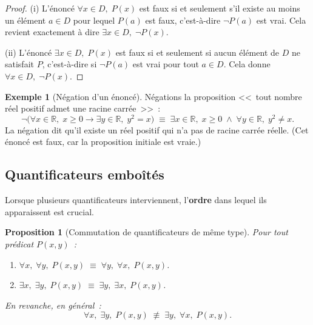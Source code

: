 \documentclass[12pt,a4paper,openany]{book}
\theoremstyle{definition}
\newtheorem{exemple}[definition]{Exemple}
\theoremstyle{plain}
\newtheorem{proposition}[definition]{Proposition}
\theoremstyle{remark}
\newcommand{\R}{\mathbb{R}}
\begin{document}
\begin{proof}
  (i) L'\'enonc\'e $\forall x \in D,\; P(x)$ est faux si et seulement s'il existe au moins un \'el\'ement $a \in D$ pour lequel $P(a)$ est faux, c'est-\`a-dire $\neg P(a)$ est vrai. Cela revient exactement \`a dire $\exists x \in D,\; \neg P(x)$.

  \smallskip
  (ii) L'\'enonc\'e $\exists x \in D,\; P(x)$ est faux si et seulement si aucun \'el\'ement de $D$ ne satisfait $P$, c'est-\`a-dire si $\neg P(a)$ est vrai pour tout $a \in D$. Cela donne $\forall x \in D,\; \neg P(x)$.
\end{proof}

\begin{exemple}[N\'egation d'un \'enonc\'e]\label{ex:negation-quantif}
  N\'egations la proposition <<~tout nombre r\'eel positif admet une racine carr\'ee~>>~:
  \[
    \neg\bigl(\forall x \in \R,\; x \geq 0 \to \exists y \in \R,\; y^2 = x\bigr)
    \;\equiv\; \exists x \in \R,\; x \geq 0 \;\land\; \forall y \in \R,\; y^2 \neq x.
  \]
  La n\'egation dit qu'il existe un r\'eel positif qui n'a pas de racine carr\'ee r\'eelle. (Cet \'enonc\'e est faux, car la proposition initiale est vraie.)
\end{exemple}

\subsection{Quantificateurs embo\^it\'es}
\label{subsec:quantificateurs-emboites}

Lorsque plusieurs quantificateurs interviennent, l'\textbf{ordre} dans lequel ils apparaissent est crucial.

\begin{proposition}[Commutation de quantificateurs de m\^eme type]\label{prop:commut-quantif}
  Pour tout pr\'edicat $P(x,y)$~:
  \begin{enumerate}[label=(\roman*)]
    \item $\forall x,\; \forall y,\; P(x,y) \;\equiv\; \forall y,\; \forall x,\; P(x,y)$.
    \item $\exists x,\; \exists y,\; P(x,y) \;\equiv\; \exists y,\; \exists x,\; P(x,y)$.
  \end{enumerate}
  En revanche, en g\'en\'eral~:
  \[
    \forall x,\; \exists y,\; P(x,y) \;\not\equiv\; \exists y,\; \forall x,\; P(x,y).
  \]
\end{proposition}
\end{document}
